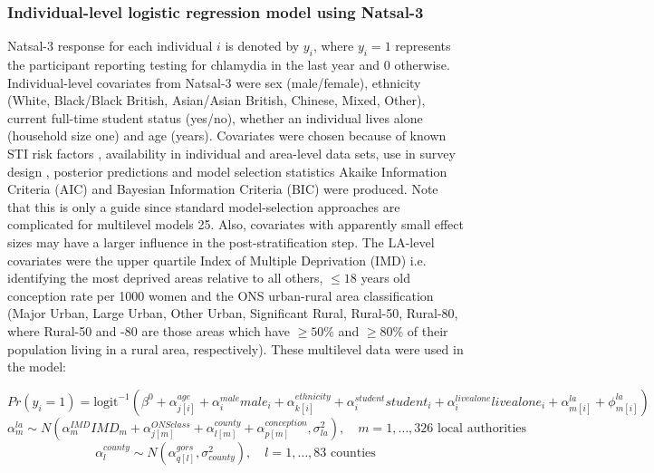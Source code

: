 \documentclass[12pt]{article}
\begin{document}
\subsubsection*{Individual-level logistic regression model using Natsal-3}
Natsal-3 response for each individual $i$ is denoted by $y_i$, where $y_i = 1$ represents the participant reporting testing for chlamydia in the last year and 0 otherwise. 
Individual-level covariates from Natsal-3 were sex (male/female), ethnicity (White, Black/Black British, Asian/Asian British, Chinese, Mixed, Other), current full-time student status (yes/no), whether an individual lives alone (household size one) and age (years). Covariates were chosen because of known STI risk factors \cite{Waroux2014}, availability in individual and area-level data sets, use in survey design \cite{Erens2013}, posterior predictions and model selection statistics Akaike Information Criteria (AIC) and Bayesian Information Criteria (BIC) \cite{Molenberghs2016} were produced. Note that this is only a guide since standard model-selection approaches are complicated for multilevel models 25. Also, covariates with apparently small effect sizes may have a larger influence in the post-stratification step.
The LA-level covariates were the upper quartile Index of Multiple Deprivation (IMD) i.e. identifying the most deprived areas relative to all others, $\leq 18$ years old conception rate per 1000 women and the ONS urban-rural area classification (Major Urban, Large Urban, Other Urban, Significant Rural, Rural-50, Rural-80, where Rural-50 and -80 are those areas which have $\geq 50$\% and $\geq 80$\% of their population living in a rural area, respectively). 
These multilevel data were used in the model:

\begin{displaymath}
Pr(y_i = 1) = \mbox{logit}^{-1} \left( \beta^0 + \alpha_{j[i]}^{age} + \alpha_i^{male} male_i + \alpha_{k[i]}^{ethnicity} + \alpha_i^{student} student_i + \alpha_i^{livealone} livealone_i + \alpha_{m[i]}^{la} + \phi_{m[i]}^{la} \right)
\end{displaymath}
\begin{displaymath}
\alpha_m^{la} \sim N \left( \alpha_m^{IMD} IMD_m + \alpha_{j[m]}^{ONSclass} + \alpha_{l[m]}^{county} + \alpha_{p[m]}^{conception}, \sigma_{la}^2 \right), \quad m = 1,\ldots, 326 \mbox{ local authorities}
\end{displaymath}
\begin{displaymath}
\alpha_l^{county} \sim N \left( \alpha_{q[l]}^{gors}, \sigma_{county}^2 \right), \quad l = 1, \ldots, 83 \mbox{ counties}
\end{displaymath}
\end{document}
